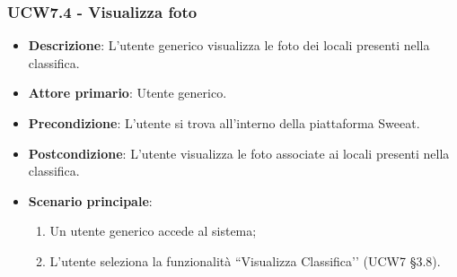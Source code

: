 \subsubsection{UCW7.4 - Visualizza foto}
\begin{itemize}
	\item \textbf{Descrizione}: L'utente generico visualizza le foto dei locali presenti nella classifica.
    \item \textbf{Attore primario}: Utente generico.
    \item \textbf{Precondizione}: L’utente si trova all’interno della piattaforma Sweeat.
    \item \textbf{Postcondizione}: L’utente visualizza le foto associate ai locali presenti nella classifica.
    \item \textbf{Scenario principale}: 
    \begin{enumerate}
        \item Un utente generico accede al sistema;
        \item L’utente seleziona la funzionalità “Visualizza Classifica’’ (UCW7 \S{}3.8).
    \end{enumerate}
\end{itemize}

